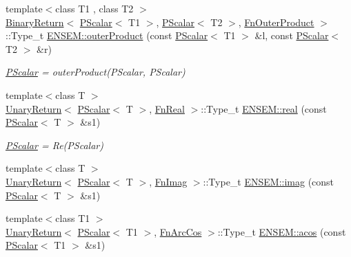 \begin{DoxyCompactItemize}
{\footnotesize template$<$class T1 , class T2 $>$ }\\\mbox{\hyperlink{structENSEM_1_1BinaryReturn}{Binary\+Return}}$<$ \mbox{\hyperlink{classENSEM_1_1PScalar}{P\+Scalar}}$<$ T1 $>$, \mbox{\hyperlink{classENSEM_1_1PScalar}{P\+Scalar}}$<$ T2 $>$, \mbox{\hyperlink{structENSEM_1_1FnOuterProduct}{Fn\+Outer\+Product}} $>$\+::Type\+\_\+t \mbox{\hyperlink{group__primscalar_gaa87ddc7f8a5ec9fc1cb807c54d727128}{E\+N\+S\+E\+M\+::outer\+Product}} (const \mbox{\hyperlink{classENSEM_1_1PScalar}{P\+Scalar}}$<$ T1 $>$ \&l, const \mbox{\hyperlink{classENSEM_1_1PScalar}{P\+Scalar}}$<$ T2 $>$ \&r)
\begin{DoxyCompactList}\small\item\em \mbox{\hyperlink{classENSEM_1_1PScalar}{P\+Scalar}} = outer\+Product(\+P\+Scalar, P\+Scalar) \end{DoxyCompactList}\item 
{\footnotesize template$<$class T $>$ }\\\mbox{\hyperlink{structENSEM_1_1UnaryReturn}{Unary\+Return}}$<$ \mbox{\hyperlink{classENSEM_1_1PScalar}{P\+Scalar}}$<$ T $>$, \mbox{\hyperlink{structENSEM_1_1FnReal}{Fn\+Real}} $>$\+::Type\+\_\+t \mbox{\hyperlink{group__primscalar_gac01f1564e4c432779ff00f12778275cf}{E\+N\+S\+E\+M\+::real}} (const \mbox{\hyperlink{classENSEM_1_1PScalar}{P\+Scalar}}$<$ T $>$ \&s1)
\begin{DoxyCompactList}\small\item\em \mbox{\hyperlink{classENSEM_1_1PScalar}{P\+Scalar}} = Re(\+P\+Scalar) \end{DoxyCompactList}\item 
{\footnotesize template$<$class T $>$ }\\\mbox{\hyperlink{structENSEM_1_1UnaryReturn}{Unary\+Return}}$<$ \mbox{\hyperlink{classENSEM_1_1PScalar}{P\+Scalar}}$<$ T $>$, \mbox{\hyperlink{structENSEM_1_1FnImag}{Fn\+Imag}} $>$\+::Type\+\_\+t \mbox{\hyperlink{group__primscalar_ga81e1ff1466afc27ec3d09728fc37d340}{E\+N\+S\+E\+M\+::imag}} (const \mbox{\hyperlink{classENSEM_1_1PScalar}{P\+Scalar}}$<$ T $>$ \&s1)
\item 
{\footnotesize template$<$class T1 $>$ }\\\mbox{\hyperlink{structENSEM_1_1UnaryReturn}{Unary\+Return}}$<$ \mbox{\hyperlink{classENSEM_1_1PScalar}{P\+Scalar}}$<$ T1 $>$, \mbox{\hyperlink{structENSEM_1_1FnArcCos}{Fn\+Arc\+Cos}} $>$\+::Type\+\_\+t \mbox{\hyperlink{group__primscalar_gac925d7a5363870efbfc14f80cbe15d63}{E\+N\+S\+E\+M\+::acos}} (const \mbox{\hyperlink{classENSEM_1_1PScalar}{P\+Scalar}}$<$ T1 $>$ \&s1)

\end{DoxyCompactItemize}
